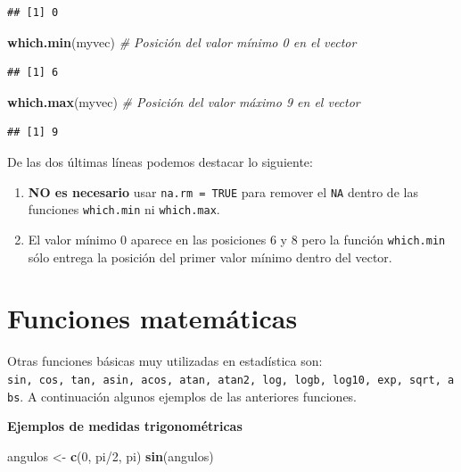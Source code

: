 \documentclass[10pt,]{krantz}
\makeatletter
\newenvironment{Shaded}{\begin{snugshade}}{\end{snugshade}}
\newcommand{\KeywordTok}[1]{\textcolor[rgb]{0.13,0.29,0.53}{\textbf{{#1}}}}
\newcommand{\DecValTok}[1]{\textcolor[rgb]{0.00,0.00,0.81}{{#1}}}
\newcommand{\StringTok}[1]{\textcolor[rgb]{0.31,0.60,0.02}{{#1}}}
\newcommand{\CommentTok}[1]{\textcolor[rgb]{0.56,0.35,0.01}{\textit{{#1}}}}
\newcommand{\NormalTok}[1]{{#1}}
\providecommand{\tightlist}{%
  \setlength{\itemsep}{0pt}\setlength{\parskip}{0pt}}
\newenvironment{kframe}{%
\medskip{}
\setlength{\fboxsep}{.8em}
 \def\at@end@of@kframe{}%
 \ifinner\ifhmode%
  \def\at@end@of@kframe{\end{minipage}}%
  \begin{minipage}{\columnwidth}%
 \fi\fi%
 \def\FrameCommand##1{\hskip\@totalleftmargin \hskip-\fboxsep
 \colorbox{shadecolor}{##1}\hskip-\fboxsep
     \hskip-\linewidth \hskip-\@totalleftmargin \hskip\columnwidth}%
 \MakeFramed {\advance\hsize-\width
   \@totalleftmargin\z@ \linewidth\hsize
   \@setminipage}}%
 {\par\unskip\endMakeFramed%
 \at@end@of@kframe}
\renewenvironment{Shaded}{\begin{kframe}}{\end{kframe}}
\makeatother
\begin{document}
\begin{verbatim}
## [1] 0
\end{verbatim}

\begin{Shaded}
\begin{Highlighting}[]
\KeywordTok{which.min}\NormalTok{(myvec)  }\CommentTok{# Posición del valor mínimo 0 en el vector}
\end{Highlighting}
\end{Shaded}

\begin{verbatim}
## [1] 6
\end{verbatim}

\begin{Shaded}
\begin{Highlighting}[]
\KeywordTok{which.max}\NormalTok{(myvec)  }\CommentTok{# Posición del valor máximo 9 en el vector}
\end{Highlighting}
\end{Shaded}

\begin{verbatim}
## [1] 9
\end{verbatim}

De las dos últimas líneas podemos destacar lo siguiente:

\begin{enumerate}
\def\labelenumi{\arabic{enumi}.}
\tightlist
\item
  \textbf{NO es necesario} usar \texttt{na.rm\ =\ TRUE} para remover el
  \texttt{NA} dentro de las funciones \texttt{which.min} ni
  \texttt{which.max}.
\item
  El valor mínimo 0 aparece en las posiciones 6 y 8 pero la función
  \texttt{which.min} sólo entrega la posición del primer valor mínimo
  dentro del vector.
\end{enumerate}

\section{Funciones matemáticas}\label{funciones-matematicas}

Otras funciones básicas muy utilizadas en estadística son:
\texttt{sin,\ cos,\ tan,\ asin,\ acos,\ atan,\ atan2,\ log,\ logb,\ log10,\ exp,\ sqrt,\ abs}.
A continuación algunos ejemplos de las anteriores funciones.

\textbf{Ejemplos de medidas trigonométricas}

\begin{Shaded}
\begin{Highlighting}[]
\NormalTok{angulos <-}\StringTok{ }\KeywordTok{c}\NormalTok{(}\DecValTok{0}\NormalTok{, pi/}\DecValTok{2}\NormalTok{, pi)}
\KeywordTok{sin}\NormalTok{(angulos)}
\end{Highlighting}
\end{Shaded}
\end{document}
